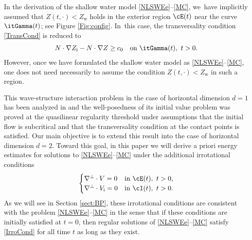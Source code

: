 \begin{remark}
In the derivation of the shallow water model \eqref{NLSWEe}--\eqref{MC}, we~have implicitly assumed that $Z(t,\cdot)<Z_\mathrm{w}$ holds in the exterior region
$\cE(t)$ near the curve $\itGamma(t)$; see Figure \ref{Fig:config}. In~this case, the transversality condition \eqref{TransCond} is reduced to
\[
N\cdot\nabla Z_\mathrm{i}-N\cdot\nabla Z \geq c_0 \quad\text{on } \itGamma(t), \ t>0.
\]
However, once we have formulated the shallow water model as \eqref{NLSWEe}--\eqref{MC},
one does not need necessarily to assume the condition $Z(t,\cdot)<Z_\mathrm{w}$ in such a region.
\end{remark}

This wave-structure interaction problem in the case of horizontal dimension $d=1$ has been analyzed in \cite{IguchiLannes2021} and
the well-posedness of its initial value problem was proved at the quasilinear regularity threshold under assumptions that
the initial flow is subcritical and that the transversality condition at the contact points is satisfied.
Our main objective is to extend this result into the case of horizontal dimension $d=2$.
Toward this goal, in this paper we will derive a priori energy estimates for solutions to \eqref{NLSWEe}--\eqref{MC} under the additional irrotational conditions
\begin{equation}\label{IrroCond}
\begin{cases}
\nabla^\perp\cdot V=0 &\text{in } \cE(t), \ t>0, \\
\nabla^\perp\cdot V_\mathrm{i}=0 &\text{in } \cI(t), \ t>0.
\end{cases}
\end{equation}
As we will see in Section \ref{sect:BP}, these irrotational conditions are consistent with the problem \eqref{NLSWEe}--\eqref{MC} in the sense that
if these conditions are initially satisfied at $t=0$, then regular solutions of \eqref{NLSWEe}--\eqref{MC} satisfy \eqref{IrroCond} for all time $t$
as long as they exist.

